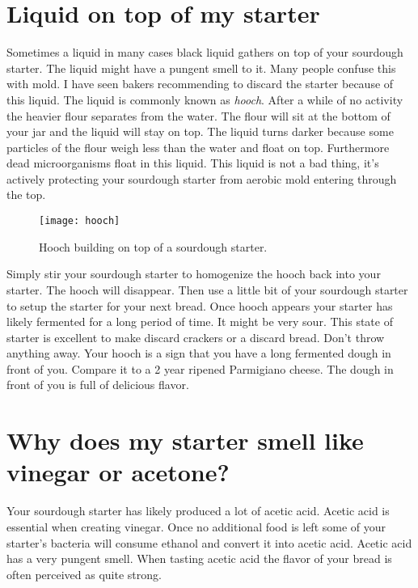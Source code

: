 \section{Liquid on top of my starter}

Sometimes a liquid in many cases black liquid gathers on top
of your sourdough starter. The liquid might have a pungent
smell to it. Many people confuse this with mold. I have seen
bakers recommending to discard the starter because of this liquid.
The liquid is commonly known as {\it hooch}. After a while
of no activity the heavier flour separates from the water. The flour
will sit at the bottom of your jar and the liquid will stay on top.
The liquid turns darker because some particles of the flour weigh
less than the water and float on top. Furthermore dead microorganisms
float in this liquid. This liquid is not a bad thing, it's actively
protecting your sourdough starter from aerobic mold entering through
the top.

\begin{figure}[!htb]
  \centering
  \texttt{[image: hooch]}
  \caption{Hooch building on top of a sourdough starter. \cite{liquid+on+starter}}
  \label{fig:hooch}
\end{figure}

Simply stir your sourdough starter to homogenize the hooch back
into your starter. The hooch will disappear. Then use a little bit of
your sourdough starter to setup the starter for your next bread.
Once hooch appears your starter has likely fermented for a long
period of time. It might be very sour. This state of starter
is excellent to make discard crackers or a discard bread. Don't throw
anything away. Your hooch is a sign that you have a long fermented
dough in front of you. Compare it to a 2 year ripened Parmigiano cheese.
The dough in front of you is full of delicious flavor.

\section{Why does my starter smell like vinegar or acetone?}

Your sourdough starter has likely produced a lot of acetic acid.
Acetic acid is essential when creating vinegar. Once no additional
food is left some of your starter's bacteria will consume ethanol
and convert it into acetic acid. Acetic acid has a very pungent smell.
When tasting acetic acid the flavor of your bread is often perceived
as quite strong.


